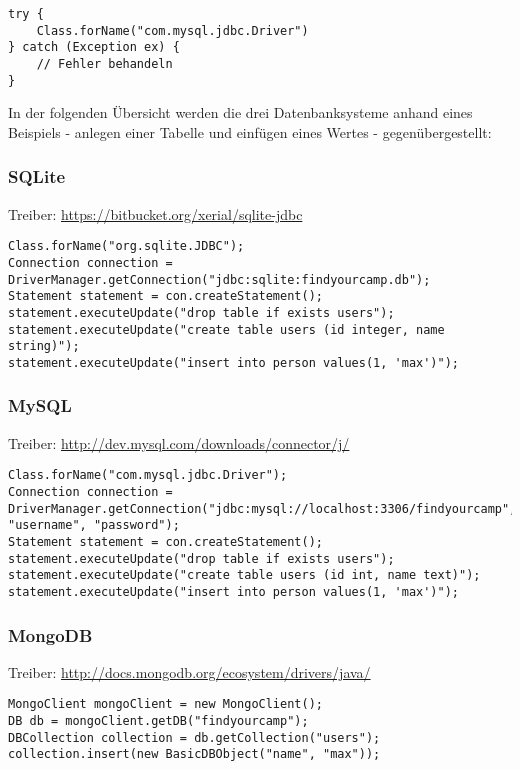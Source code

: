 \begin{lstlisting}[label=ls:correctdriveruse,caption=Korrekter dynamischer Klassenaufruf]
try {
	Class.forName("com.mysql.jdbc.Driver")
} catch (Exception ex) {
	// Fehler behandeln
}
\end{lstlisting}

In der folgenden Übersicht werden die drei Datenbanksysteme anhand eines Beispiels - anlegen einer Tabelle und einfügen eines Wertes - gegenübergestellt:

\subsubsection{SQLite}

Treiber: \url{https://bitbucket.org/xerial/sqlite-jdbc}
\begin{lstlisting}[label=ls:mysqlexample,caption=Exemplarische Darstellung der Nutzung des SQLite Treibers]
Class.forName("org.sqlite.JDBC");
Connection connection = DriverManager.getConnection("jdbc:sqlite:findyourcamp.db");
Statement statement = con.createStatement();
statement.executeUpdate("drop table if exists users");
statement.executeUpdate("create table users (id integer, name string)");
statement.executeUpdate("insert into person values(1, 'max')");
\end{lstlisting}

\subsubsection{MySQL}

Treiber: \url{http://dev.mysql.com/downloads/connector/j/}
\begin{lstlisting}[label=ls:mysqlexample,caption=Exemplarische Darstellung der Nutzung des MySQL Treibers]
Class.forName("com.mysql.jdbc.Driver");
Connection connection = DriverManager.getConnection("jdbc:mysql://localhost:3306/findyourcamp", "username", "password");
Statement statement = con.createStatement();
statement.executeUpdate("drop table if exists users");
statement.executeUpdate("create table users (id int, name text)");
statement.executeUpdate("insert into person values(1, 'max')");
\end{lstlisting}

\subsubsection{MongoDB}

Treiber: \url{http://docs.mongodb.org/ecosystem/drivers/java/}
\begin{lstlisting}[label=ls:mongoexample,caption=Exemplarische Darstellung der Nutzung des MongoDB Treibers]
MongoClient mongoClient = new MongoClient();
DB db = mongoClient.getDB("findyourcamp");
DBCollection collection = db.getCollection("users");
collection.insert(new BasicDBObject("name", "max"));
\end{lstlisting}


